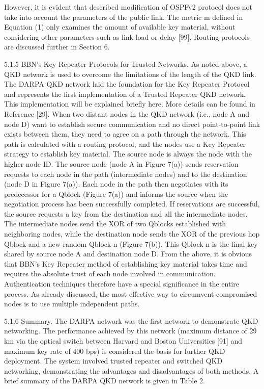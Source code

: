 However, it is evident that described modification of OSPFv2 protocol does not take into account the parameters of the public link. The metric m defined in Equation (1) only examines the amount of available key material, without considering other parameters such as link load or delay [99].
Routing protocols are discussed further in Section 6.

5.1.5 BBN’s Key Repeater Protocols for Trusted Networks. As noted above, a QKD network is used to overcome the limitations of the length of the QKD link. The DARPA QKD network laid the foundation for the Key Repeater Protocol and represents the first implementation of a Trusted Repeater QKD network. This implementation will be explained briefly here. More details can be found in Reference [29].
When two distant nodes in the QKD network (i.e., node A and node D) want to establish secure communication and no direct point-to-point link exists between them, they need to agree on a path through the network. This path is calculated with a routing protocol, and the nodes use a Key Repeater strategy to establish key material. The source node is always the node with the higher node ID. The source node (node A in Figure 7(a)) sends reservation requests to each node in the path (intermediate nodes) and to the destination (node D in Figure 7(a)). Each node in the path then negotiates with its predecessor for a Qblock (Figure 7(a)) and informs the source when the negotiation process has been successfully completed. If reservations are successful, the source requests a key from the destination and all the intermediate nodes. The intermediate nodes send the XOR of two Qblocks established with neighboring nodes, while the destination node sends the XOR of the previous hop Qblock and a new random Qblock n (Figure 7(b)). This Qblock n is the final key shared by source node A and destination node D.
From the above, it is obvious that BBN’s Key Repeater method of establishing key material takes time and requires the absolute trust of each node involved in communication. Authentication techniques therefore have a special significance in the entire process. As already discussed, the most effective way to circumvent compromised nodes is to use multiple independent paths.


5.1.6 Summary. The DARPA network was the first network to demonstrate QKD networking.
The performance achieved by this network (maximum distance of 29 km via the optical switch between Harvard and Boston Universities [91] and maximum key rate of 400 bps) is considered the basis for further QKD deployment. The system involved trusted repeater and switched QKD networking, demonstrating the advantages and disadvantages of both methods. A brief summary of the DARPA QKD network is given in Table 2.

